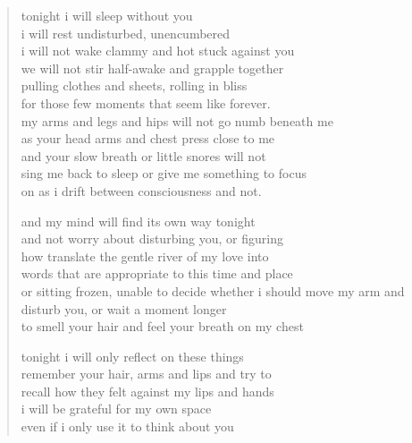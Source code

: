 \begin{verse}
tonight i will sleep without you \\
i will rest undisturbed, unencumbered \\
i will not wake clammy and hot stuck against you \\
we will not stir half-awake and grapple together \\
pulling clothes and sheets, rolling in bliss \\
for those few moments that seem like forever. \\
my arms and legs and hips will not go numb beneath me \\
as your head arms and chest press close to me \\
and your slow breath or little snores will not \\
sing me back to sleep or give me something to focus \\
on as i drift between consciousness and not. 

and my mind will find its own way tonight \\
and not worry about disturbing you, or figuring \\
how translate the gentle river of my love into \\
words that are appropriate to this time and place \\
or sitting frozen, unable to decide whether i should 
move my arm and disturb you, or wait a moment longer \\
to smell your hair and feel your breath on my chest

tonight i will only reflect on these things \\
remember your hair, arms and lips and try to \\
recall how they felt against my lips and hands \\
i will be grateful for my own space \\
even if i only use it to think about you
\end{verse}
